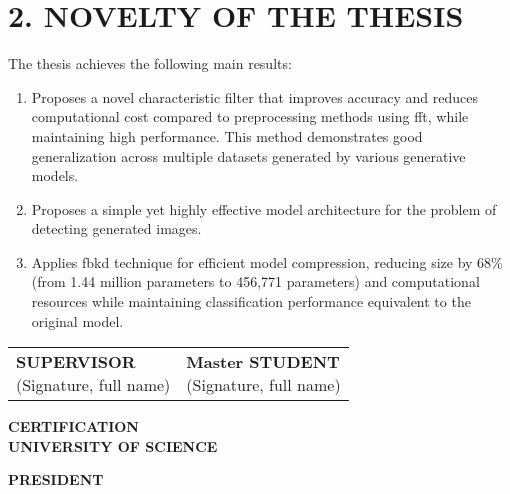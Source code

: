 \section*{2. NOVELTY OF THE THESIS}
The thesis achieves the following main results:

\begin{enumerate}
	\item Proposes a novel characteristic filter that improves accuracy and reduces computational cost compared to preprocessing methods using \gls{fft}, while maintaining high performance. This method demonstrates good generalization across multiple datasets generated by various generative models.
	
	\item Proposes a simple yet highly effective model architecture for the problem of detecting generated images.
	
	\item Applies \gls{fbkd} technique for efficient model compression, reducing size by 68\% (from 1.44 million parameters to 456,771 parameters) and computational resources while maintaining classification performance equivalent to the original model.
	
\end{enumerate}

\vspace{4\baselineskip}
\begin{table}[h]
	\begin{adjustbox}{max width =\textwidth}
		\begin{tabular}{p{8.44cm}p{8.4cm}}
			\multicolumn{1}{p{8.44cm}}{
				\centering \textbf{SUPERVISOR} \newline
				\centering
				(Signature, full name) \newline
			} &
			\multicolumn{1}{p{8.4cm}}{
				\centering \textbf{Master STUDENT} \newline
				\centering
				(Signature, full name) \newline
			} \\
		\end{tabular}
	\end{adjustbox}
\end{table}
\vspace{2\baselineskip}
\begin{center}
	\textbf{CERTIFICATION \\ UNIVERSITY OF SCIENCE}
\end{center}
\begin{center}
	\textbf{PRESIDENT}
\end{center}









